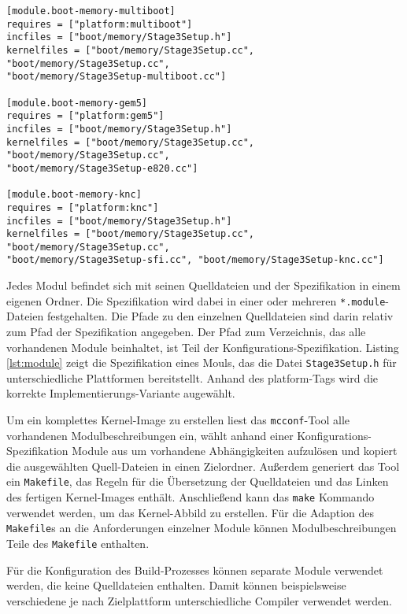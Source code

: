 \begin{lstlisting}[float, label=lst:module, caption=Ein Beispiel einer 
Modulbeschreibung.]
[module.boot-memory-multiboot]
requires = ["platform:multiboot"]
incfiles = ["boot/memory/Stage3Setup.h"]
kernelfiles = ["boot/memory/Stage3Setup.cc", "boot/memory/Stage3Setup.cc", 
"boot/memory/Stage3Setup-multiboot.cc"]

[module.boot-memory-gem5]
requires = ["platform:gem5"]
incfiles = ["boot/memory/Stage3Setup.h"]
kernelfiles = ["boot/memory/Stage3Setup.cc", "boot/memory/Stage3Setup.cc", 
"boot/memory/Stage3Setup-e820.cc"]

[module.boot-memory-knc]
requires = ["platform:knc"]
incfiles = ["boot/memory/Stage3Setup.h"]
kernelfiles = ["boot/memory/Stage3Setup.cc", "boot/memory/Stage3Setup.cc", 
"boot/memory/Stage3Setup-sfi.cc", "boot/memory/Stage3Setup-knc.cc"]
\end{lstlisting}

Jedes Modul befindet sich mit seinen Quelldateien und der Spezifikation in einem
eigenen Ordner. Die Spezifikation wird dabei in einer oder mehreren
\texttt{*.module}-Dateien festgehalten. Die Pfade zu den einzelnen Quelldateien
sind darin relativ zum Pfad der Spezifikation angegeben. Der Pfad zum
Verzeichnis, das alle vorhandenen Module beinhaltet, ist Teil der
Konfigurations-Spezifikation. Listing \ref{lst:module} zeigt die Spezifikation
eines Mouls, das die Datei \texttt{Stage3Setup.h} für unterschiedliche
Plattformen bereitstellt. Anhand des platform-Tags wird die korrekte
Implementierungs-Variante augewählt.

Um ein komplettes Kernel-Image zu erstellen liest das \texttt{mcconf}-Tool alle
vorhandenen Modulbeschreibungen ein, wählt anhand einer
Konfigurations-Spezifikation Module aus um vorhandene Abhängigkeiten aufzulösen
und kopiert die ausgewählten Quell-Dateien in einen Zielordner.
Außerdem generiert das Tool ein \texttt{Makefile}, das Regeln für die
Übersetzung der Quelldateien und das Linken des fertigen Kernel-Images enthält.
Anschließend kann das \texttt{make} Kommando verwendet werden, um das
Kernel-Abbild zu erstellen. Für die Adaption des \texttt{Makefile}s an die
Anforderungen einzelner Module können Modulbeschreibungen Teile des
\texttt{Makefile} enthalten.

Für die Konfiguration des Build-Prozesses können separate Module verwendet
werden, die keine Quelldateien enthalten. Damit können beispielsweise
verschiedene je nach Zielplattform  unterschiedliche Compiler verwendet werden.

